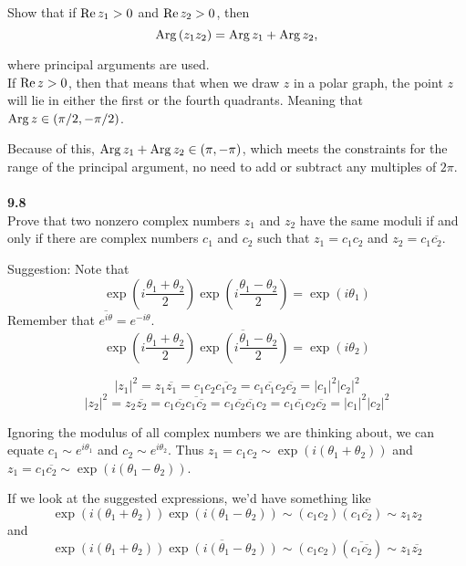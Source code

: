 Show that if $\operatorname{Re}{z_1} > 0$ and $\operatorname{Re}{z_2} > 0$, then
$$
\operatorname{Arg}{(z_1 z_2)} = \operatorname{Arg}{z_1} + \operatorname{Arg}{z_2},
$$

where principal arguments are used.
\\

If $\operatorname{Re}{z} > 0$, then that means that when we draw $z$ in a polar graph, the point $z$ will lie in either the first
or the fourth quadrants.
Meaning that $\operatorname{Arg}{z} \in (\pi/2, -\pi/2)$.

Because of this, $\operatorname{Arg}{z_1} + \operatorname{Arg}{z_2} \in (\pi, -\pi)$, which meets the constraints for the range of the principal argument,
no need to add or subtract any multiples of $2\pi$.
\\~\\


\textbf{9.8}
\\

Prove that two nonzero complex numbers $z_1$ and $z_2$ have the same moduli if and only if there are complex numbers
$c_1$ and $c_2$ such that $z_1 = c_1 c_2$ and $z_2 = c_1 \overline{c_2}$.

Suggestion: Note that
$$
\exp\left(i\frac{\theta_1 + \theta_2}{2}\right) \exp\left(i\frac{\theta_1 - \theta_2}{2}\right) = \exp\left(i \theta_1 \right)
$$
Remember that $\overline{e^{i\theta}} = e^{-i\theta}$.
$$
\exp\left(i\frac{\theta_1 + \theta_2}{2}\right) \overline{
    \exp\left(i\frac{\theta_1 - \theta_2}{2}\right)
 } = \exp\left(i \theta_2 \right)
$$

$$
|z_1|^2 = z_1 \overline{z_1} = c_1 c_2 \overline{c_1 c_2} = c_1 \overline{c_1} c_2 \overline{c_2}
= |c_1|^2 |c_2|^2
$$
$$
|z_2|^2 = z_2 \overline{z_2} = c_1 \overline{c_2} \overline{c_1 \overline{c_2}} = c_1 \overline{c_2} \overline{c_1} c_2
= c_1 \overline{c_1} c_2 \overline{c_2}
= |c_1|^2 |c_2|^2
$$

Ignoring the modulus of all complex numbers we are thinking about, we can equate $c_1 \sim e^{i\theta_1}$ and $c_2 \sim e^{i\theta_2}$.
Thus $z_1 = c_1 c_2 \sim \exp\left(i\left(\theta_1 + \theta_2\right)\right)$
and $z_1 = c_1 \overline{c_2} \sim \exp\left(i\left(\theta_1 - \theta_2\right)\right)$.

If we look at the suggested expressions,
we'd have something like
$$
\exp\left(i\left(\theta_1 + \theta_2\right)\right) \exp\left(i\left(\theta_1 - \theta_2\right)\right)
\sim
\left(c_1 c_2\right) \left(c_1 \overline{c_2}\right)
\sim
z_1 z_2
$$
and
$$
\exp\left(i\left(\theta_1 + \theta_2\right)\right) \overline{ \exp\left(i\left(\theta_1 - \theta_2\right)\right) }
\sim
\left(c_1 c_2\right) \left(\overline{c_1 \overline{c_2}}\right)
\sim
z_1 \overline{z_2}
$$

